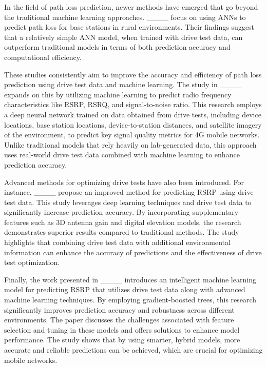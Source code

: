 In the field of path loss prediction, newer methods have emerged that go beyond the traditional machine learning approaches. ____ focus on using \glspl{ANN} to predict path loss for base stations in rural environments. Their findings suggest that a relatively simple ANN model, when trained with drive test data, can outperform traditional models in terms of both prediction accuracy and computational efficiency.

These studies consistently aim to improve the accuracy and efficiency of path loss prediction using drive test data and machine learning. The study in ____ expands on this by utilizing machine learning to predict radio frequency characteristics like RSRP, RSRQ, and signal-to-noise ratio. This research employs a deep neural network trained on data obtained from drive tests, including device locations, base station locations, device-to-station distances, and satellite imagery of the environment, to predict key signal quality metrics for 4G mobile networks. Unlike traditional models that rely heavily on lab-generated data, this approach uses real-world drive test data combined with machine learning to enhance prediction accuracy.

Advanced methods for optimizing drive tests have also been introduced. For instance, ____ propose an improved method for predicting \gls{RSRP} using drive test data. This study leverages deep learning techniques and drive test data to significantly increase prediction accuracy. By incorporating supplementary features such as 3D antenna gain and digital elevation models, the research demonstrates superior results compared to traditional methods. The study highlights that combining drive test data with additional environmental information can enhance the accuracy of predictions and the effectiveness of drive test optimization.

Finally, the work presented in ____ introduces an intelligent machine learning model for predicting \gls{RSRP} that utilizes drive test data along with advanced machine learning techniques. By employing gradient-boosted trees, this research significantly improves prediction accuracy and robustness across different environments. The paper discusses the challenges associated with feature selection and tuning in these models and offers solutions to enhance model performance. The study shows that by using smarter, hybrid models, more accurate and reliable predictions can be achieved, which are crucial for optimizing mobile networks.